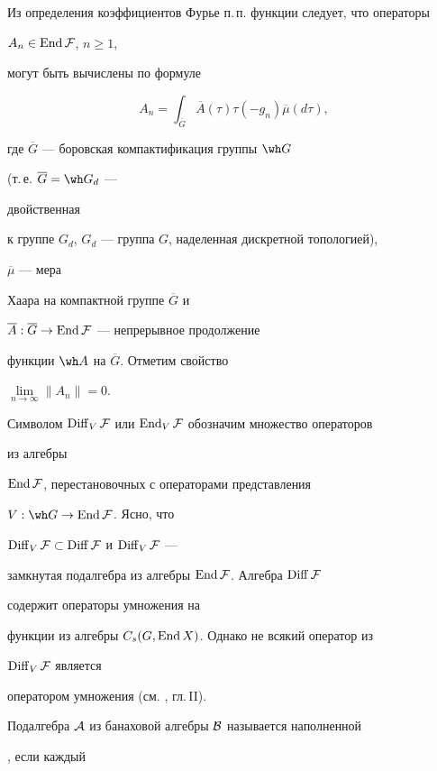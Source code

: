  


Из определения коэффициентов Фурье п.\,п. функции следует, что операторы 


$A_n\in\operatorname{End}\cal F$, $n\ge 1$,


могут быть вычислены по формуле 


\begin{equation} 


A_n=\int_{\overline G}\overline A(\tau)\tau(-g_n)\overline\mu(d\tau), 


\end{equation} 


где $\overline G$ --- боровская компактификация группы $\wh G$ 


(т.\,е. $\overline G=\wh G_d$ --- 


двойственная 


к группе $G_d$, $G_d$ --- группа $G$, наделенная дискретной топологией), 


$\overline\mu$ --- мера 


Хаара на компактной группе $\overline G$ и 


$\overline A:\overline G\to\operatorname{End}\cal F$ --- непрерывное продолжение 


функции $\wh A$ на $\overline G$. Отметим свойство 


$\lim\limits_{n\to\infty}\|A_n\|=0$. 


 


Символом $\operatorname{Diff}_V\cal F$ или $\operatorname{End}_V\cal F$ обозначим множество операторов 


из алгебры 


$\operatorname{End}\cal F$, перестановочных с операторами представления 


$V:\wh G\to\End\cal F$. Ясно, что 


$\operatorname{Diff}_V\cal F\subset\operatorname{Diff}\cal F$ и $\operatorname{Diff}_V\cal F$ --- 


замкнутая подалгебра из алгебры $\operatorname{End}\cal F$. Алгебра $\operatorname{Diff}\cal F$ 


содержит операторы умножения на 


функции из алгебры $C_s(G,\operatorname{End} X)$. Однако не всякий оператор из 


$\operatorname{Diff}_V\cal F$ является 


оператором умножения (см. \cite{Kur}, гл.\,II). 


 


Подалгебра $\cal A$ из банаховой алгебры $\cal B$ называется наполненной 


\cite{Bou}, если каждый 


